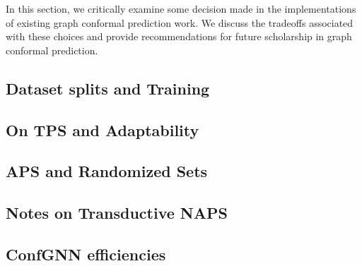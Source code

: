 In this section, we critically examine some decision made in the implementations of existing graph conformal prediction work.
We discuss the tradeoffs associated with these choices and provide recommendations for future scholarship in graph conformal prediction.

\subsection{Dataset splits and Training}



\subsection{On TPS and Adaptability}


\subsection{APS and Randomized Sets}



\subsection{Notes on Transductive NAPS}


\subsection{ConfGNN efficiencies}

